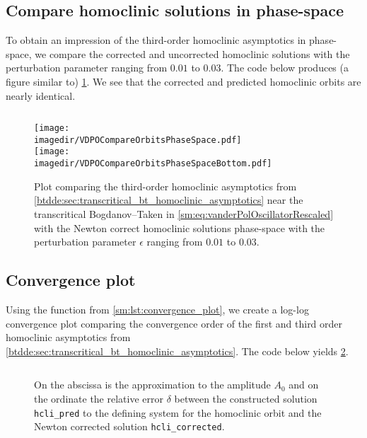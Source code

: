 \subsection{Compare homoclinic solutions in phase-space}
To obtain an impression of the third-order homoclinic asymptotics in
phase-space, we compare the corrected and uncorrected homoclinic solutions
with the perturbation parameter ranging from $0.01$ to $0.03$.
The code below produces (a figure similar to) \cref{sm:fig:VDPOCompareOrbitsPhaseSpace}.
We see that the corrected and predicted homoclinic orbits are nearly identical.
\inputminted[firstline=203, lastline=230]{MATLAB}{\pathToDDEBifToolDemos/vdpo_bt_transcritical/vanderPolOscillator.m}
%
\begin{figure}[ht!]
    \centering
    \texttt{[image: \\imagedir/VDPOCompareOrbitsPhaseSpace.pdf]} \\
    \vspace*{20pt}
    \texttt{[image: \\imagedir/VDPOCompareOrbitsPhaseSpaceBottom.pdf]}
    \caption{Plot comparing the third-order homoclinic asymptotics from
        \cref{btdde:sec:transcritical_bt_homoclinic_asymptotics} near the
        transcritical Bogdanov--Taken in
        \cref{sm:eq:vanderPolOscillatorRescaled} with the Newton correct
        homoclinic solutions phase-space with the perturbation parameter
        $\epsilon$ ranging from $0.01$ to $0.03$.}
    \label{sm:fig:VDPOCompareOrbitsPhaseSpace}
\end{figure}

\subsection{Convergence plot}
\label{sm:sec:vdpo:convergence_plot}
Using the function from \cref{sm:lst:convergence_plot}, we create a log-log
convergence plot comparing the convergence order of the first and third order
homoclinic asymptotics from \cref{btdde:sec:transcritical_bt_homoclinic_asymptotics}.
The code below yields \cref{sm:fig:VDPOConvergencePlot}.
\inputminted[firstline=232, lastline=243]{MATLAB}{\pathToDDEBifToolDemos/vdpo_bt_transcritical/vanderPolOscillator.m}
%
\begin{figure}[ht]
    \centering
        \caption{On the abscissa is the approximation to the amplitude $A_0$ and on
        the ordinate the relative error $\delta$ between the constructed solution
        \texttt{hcli_pred} to the defining system for the homoclinic orbit
        and the Newton corrected solution \texttt{hcli_corrected}.}
    \label{sm:fig:VDPOConvergencePlot}
\end{figure}

